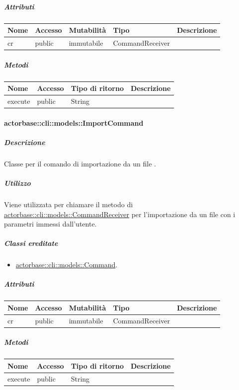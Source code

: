 \documentclass{scalatekids-article}
\begin{document}
\subparagraph{Attributi}

\begin{tabular}{| l | l | l | l | l |}
  \hline
  Nome & Accesso & Mutabilità & Tipo & Descrizione\\
  \hline
  cr & public & immutabile & CommandReceiver & \\
  \hline
\end{tabular}

\subparagraph{Metodi}

\begin{tabular}{| l | l | l | l |}
  \hline
  Nome & Accesso & Tipo di ritorno & Descrizione\\
  \hline
  execute & public & String & \\
  \hline
\end{tabular}

\paragraph{actorbase::cli::models::ImportCommand}
\label{sec:actorbase::cli::models::ImportCommand}

\subparagraph{Descrizione}

Classe per il comando di importazione da un file .

\subparagraph{Utilizzo}

Viene utilizzata per chiamare il metodo di
\hyperref[sec:actorbase::cli::models::CommandReceiver]{actorbase::cli::models::CommandReceiver} per l'importazione da un file
 con i parametri immessi dall'utente.

\subparagraph{Classi ereditate}

\begin{itemize}
\item \hyperref[sec:actorbase::cli::models::Command]{actorbase::cli::models::Command}.
\end{itemize}

\subparagraph{Attributi}

\begin{tabular}{| l | l | l | l | l |}
  \hline
  Nome & Accesso & Mutabilità & Tipo & Descrizione\\
  \hline
  cr & public & immutabile & CommandReceiver & \\
  \hline
\end{tabular}

\subparagraph{Metodi}

\begin{tabular}{| l | l | l | l |}
  \hline
  Nome & Accesso & Tipo di ritorno & Descrizione\\
  \hline
  execute & public & String & \\
  \hline
\end{tabular}
\end{document}
